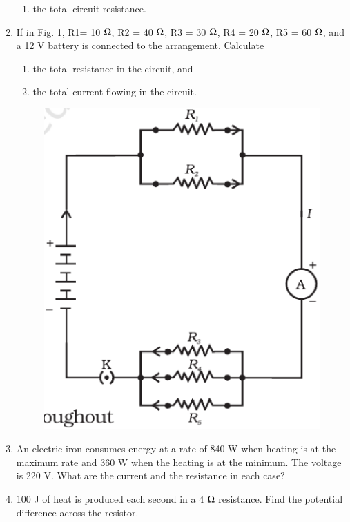 \begin{enumerate}[label=\arabic*.,ref=\thesection.\theenumi]
\begin{enumerate}
\item   the total circuit resistance.
\end{enumerate}
\item  If in Fig. \ref{fig:ckt_class10},
R1= 10 $\ohm$, R2 = 40 $\ohm$, R3 = 30 $\ohm$, R4 = 20 $\ohm$, R5 = 60 $\ohm$,
and a 12 V battery is connected to the arrangement. Calculate 
%
\begin{enumerate}
\item  the total resistance in the circuit, and 
\item  the total current flowing in the circuit.
\end{enumerate}

\begin{figure}[!ht]
\centering
\includegraphics[width=\columnwidth]{./figs/ckt.eps}
\caption{}
\label{fig:ckt_class10}
\end{figure}
\item  An electric iron consumes energy at a rate of 840 W when heating is at the maximum rate and 360 W when the heating is at the minimum. The voltage is 220 V. What are the current and the resistance in each case?
\item  100 J of heat is produced each second in a 4 $\ohm$ resistance. Find the potential difference across the resistor.

\end{enumerate}
